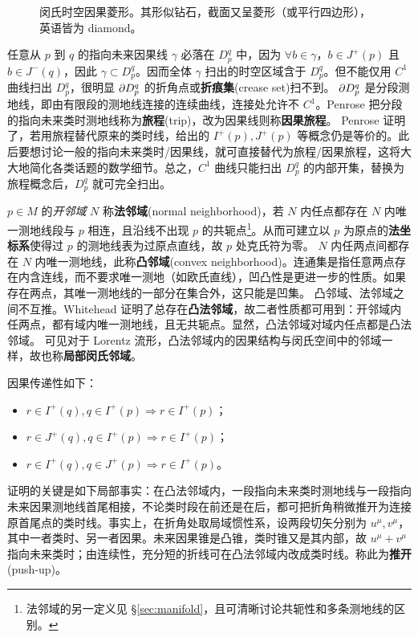 \begin{figure}
    \centering
    \caption{\small 闵氏时空因果菱形。其形似钻石，截面又呈菱形（或平行四边形），英语皆为 diamond。}
\end{figure}
任意从 $p$ 到 $q$ 的指向未来因果线 $\gamma$ 必落在 $D_p^q$ 中，因为 $\forall b\in\gamma$，$b\in J^+(p)$ 且 $b\in J^-(q)$，因此 $\gamma\subset D_p^q$。因而全体 $\gamma$ 扫出的时空区域含于 $D_p^q$。但不能仅用 $C^1$ 曲线扫出 $D_p^q$，很明显 $\partial D_p^q$ 的折角点或\textbf{折痕集}(crease set)扫不到。
$\partial D_p^q$ 是分段测地线，即由有限段的测地线连接的连续曲线，连接处允许不 $C^1$。Penrose 把分段的指向未来类时测地线称为\textbf{旅程}(trip)，改为因果线则称\textbf{因果旅程}。
Penrose 证明了，若用旅程替代原来的类时线，给出的 $I^+(p),J^+(p)$ 等概念仍是等价的。此后要想讨论一般的指向未来类时/因果线，就可直接替代为旅程/因果旅程，这将大大地简化各类话题的数学细节。总之，$C^1$ 曲线只能扫出 $D_p^q$ 的内部开集，替换为旅程概念后，$D_p^q$ 就可完全扫出。

$p\in M$ 的\emph{开邻域} $N$ 称\textbf{法邻域}(normal neighborhood)，若 $N$ 内任点都存在 $N$ 内唯一测地线段与 $p$ 相连，且沿线不出现 $p$ 的共轭点\footnote{法邻域的另一定义见 \S\ref{sec:manifold}，且可清晰讨论共轭性和多条测地线的区别。}。从而可建立以 $p$ 为原点的\textbf{法坐标系}使得过 $p$ 的测地线表为过原点直线，故 $p$ 处克氏符为零。
$N$ 内任两点间都存在 $N$ 内唯一测地线，此称\textbf{凸邻域}(convex neighborhood)。连通集是指任意两点存在内含连线，而不要求唯一测地（如欧氏直线），凹凸性是更进一步的性质。如果存在两点，其唯一测地线的一部分在集合外，这只能是凹集。
凸邻域、法邻域之间不互推。Whitehead 证明了总存在\textbf{凸法邻域}，故二者性质都可用到：开邻域内任两点，都有域内唯一测地线，且无共轭点。显然，凸法邻域对域内任点都是凸法邻域。
可见对于 Lorentz 流形，凸法邻域内的因果结构与闵氏空间中的邻域一样，故也称\textbf{局部闵氏邻域}。

因果传递性如下：
\begin{itemize}
    \item $r\in I^+(q), q\in I^+(p) \Rightarrow r\in I^+(p)$；
    \item $r\in J^+(q), q\in I^+(p) \Rightarrow r\in I^+(p)$；
    \item $r\in I^+(q), q\in J^+(p) \Rightarrow r\in I^+(p)$。
\end{itemize}
证明的关键是如下局部事实：在凸法邻域内，一段指向未来类时测地线与一段指向未来因果测地线首尾相接，不论类时段在前还是在后，都可把折角稍微推开为连接原首尾点的类时线。事实上，在折角处取局域惯性系，设两段切矢分别为 $u^\mu,v^\mu$，其中一者类时、另一者因果。未来因果锥是凸锥，类时锥又是其内部，故 $u^\mu+v^\mu$ 指向未来类时；由连续性，充分短的折线可在凸法邻域内改成类时线。称此为\textbf{推开}(push-up)。

